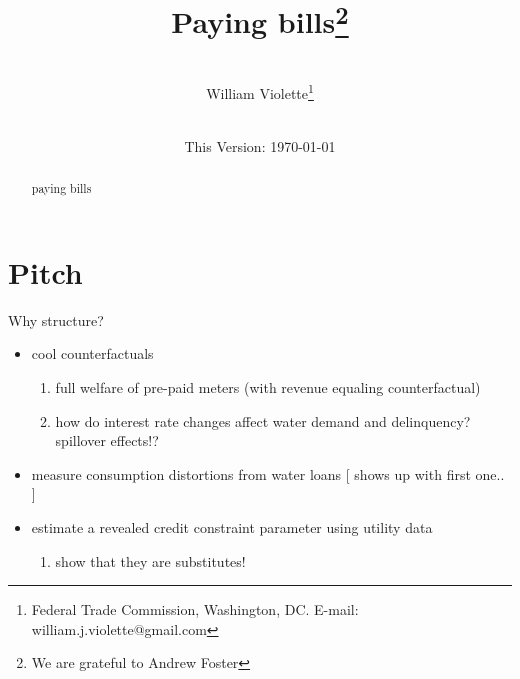 \documentclass[12pt]{article}
\begin{document}
\begin{titlepage} 
\title{{Paying bills}\thanks{We are grateful to Andrew Foster}}
\author{\\[3em]
  William Violette\thanks{Federal Trade Commission, Washington, DC. E-mail: william.j.violette@gmail.com} \\
 \\ 
  }
\vspace{30mm}
\date{\vspace{5mm}This Version: \today}
\maketitle
\begin{abstract}

	paying bills


\bigskip
\end{abstract}
\setcounter{page}{0}
\thispagestyle{empty}
\end{titlepage}
\pagebreak \newpage



\section{Pitch}

Why structure?
\begin{itemize}
    \item cool counterfactuals
        \begin{enumerate}
            \item full welfare of pre-paid meters (with revenue equaling counterfactual)
            \item how do interest rate changes affect water demand and delinquency? spillover effects!?
        \end{enumerate}
    \item measure consumption distortions from water loans [ shows up with first one.. ]
    \item estimate a revealed credit constraint parameter using utility data
        \begin{enumerate}
            \item show that they are substitutes!
        \end{enumerate}
\end{itemize}
\end{document}
